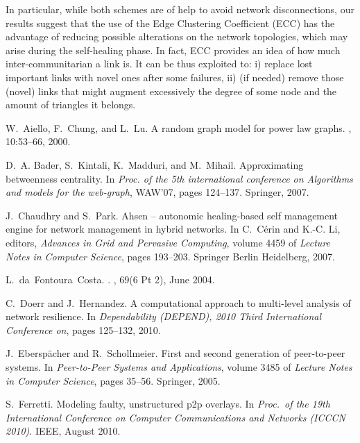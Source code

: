 \documentclass[10pt, conference, compsocconf]{IEEEtran}
\begin{document}
In particular, while both schemes are of help to avoid network disconnections, our results suggest that the use of the Edge Clustering Coefficient (ECC) has the advantage of reducing possible alterations on the network topologies, which may arise during the self-healing phase.
In fact, ECC provides an idea of how much inter-communitarian a link is. It can be thus exploited to: i) replace lost important links with novel ones after some failures, ii) (if needed) remove those (novel) links that might augment excessively the degree of some node and the amount of triangles it belongs. 



\begin{thebibliography}{10}

W.~Aiello, F.~Chung, and L.~Lu.
\newblock A random graph model for power law graphs.
, 10:53--66, 2000.

D.~A. Bader, S.~Kintali, K.~Madduri, and M.~Mihail.
\newblock Approximating betweenness centrality.
\newblock In {\em Proc. of the 5th international conference on Algorithms and
  models for the web-graph}, WAW'07, pages 124--137. Springer, 2007.

J.~Chaudhry and S.~Park.
\newblock Ahsen – autonomic healing-based self management engine for network
  management in hybrid networks.
\newblock In C.~Cérin and K.-C. Li, editors, {\em Advances in Grid and
  Pervasive Computing}, volume 4459 of {\em Lecture Notes in Computer Science},
  pages 193--203. Springer Berlin Heidelberg, 2007.

L.~da~Fontoura~Costa.
.
, 69(6 Pt 2), June 2004.

C.~Doerr and J.~Hernandez.
\newblock A computational approach to multi-level analysis of network
  resilience.
\newblock In {\em Dependability (DEPEND), 2010 Third International Conference
  on}, pages 125--132, 2010.

J.~Eberspächer and R.~Schollmeier.
\newblock First and second generation of peer-to-peer systems.
\newblock In {\em Peer-to-Peer Systems and Applications}, volume 3485 of {\em
  Lecture Notes in Computer Science}, pages 35--56. Springer, 2005.

S.~Ferretti.
\newblock Modeling faulty, unstructured p2p overlays.
\newblock In {\em Proc.~of the 19th International Conference on Computer
  Communications and Networks (ICCCN 2010)}. IEEE, August 2010.


\end{thebibliography}
\end{document}
